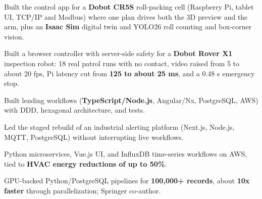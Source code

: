 \documentclass[letterpaper,10pt]{article}
\begin{document}
\begin{points}
  \item Built the control app for a \textbf{Dobot CR5S} roll-packing cell (Raspberry Pi, tablet UI, TCP/IP and Modbus) where one plan drives both the 3D preview and the arm, plus an \textbf{Isaac Sim} digital twin and YOLO26 roll counting and box-corner vision.
  \item Built a browser controller with server-side safety for a \textbf{Dobot Rover X1} inspection robot: 18 real patrol runs with no contact, video raised from 5 to about 20 fps, Pi latency cut from \textbf{125 to about 25 ms}, and a 0.48 s emergency stop.
\end{points}

\begin{points}
  \item Built lending workflows (\textbf{TypeScript/Node.js}, Angular/Nx, PostgreSQL, AWS) with DDD, hexagonal architecture, and tests.
\end{points}

\begin{points}
  \item Led the staged rebuild of an industrial alerting platform (Next.js, Node.js, MQTT, PostgreSQL) without interrupting live workflows.
\end{points}

\begin{points}
  \item Python microservices, Vue.js UI, and InfluxDB time-series workflows on AWS, tied to \textbf{HVAC energy reductions of up to 50\%}.
\end{points}

\begin{points}
  \item GPU-backed Python/PostgreSQL pipelines for \textbf{100,000+ records}, about \textbf{10x faster} through parallelization; Springer co-author.
\end{points}
\end{document}
